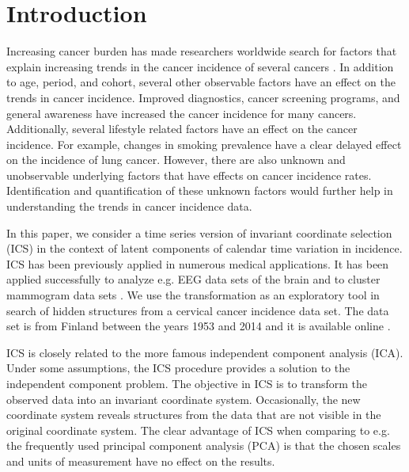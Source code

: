 \documentclass{llncs}
\begin{document}
\section{Introduction}\label{intro}
Increasing cancer burden has made researchers worldwide search for factors that explain increasing trends in the cancer incidence of several cancers \citep{parkin2011}. In addition to age, period, and cohort, several other observable factors have an effect on the trends in cancer incidence. Improved diagnostics,  cancer screening programs, and general awareness have increased the  cancer incidence for many cancers. Additionally, several lifestyle related factors have an effect on the cancer incidence. For example, changes in smoking prevalence have a clear delayed effect on the incidence of lung cancer. However, there are also unknown and unobservable underlying factors that have effects on cancer incidence rates. Identification and quantification of these unknown factors would further help in understanding the trends in cancer incidence data.

In this paper, we consider a time series version of invariant coordinate selection (ICS) in the context of latent components of calendar time variation in incidence. ICS has been previously applied in numerous medical applications. It has been applied successfully to analyze e.g. EEG data sets of the brain \cite{joyce2004} and to cluster mammogram data sets \cite{gallardo2012}.
We use the transformation as an exploratory tool in search of hidden structures from a cervical cancer incidence data set. The data set is from Finland between the years 1953 and 2014 and it is available online \cite{engholm2010}.

ICS is closely related to the more famous independent component analysis (ICA). Under some assumptions, the ICS procedure provides a solution to the independent component problem. The objective in ICS is to transform the observed data into an invariant coordinate system. Occasionally,  the new coordinate system reveals structures from the data that are not visible in the original coordinate system. The clear advantage of ICS when comparing to e.g. the frequently used principal component analysis (PCA) is that the chosen scales and units of measurement have no effect on the results. 

\end{document}
